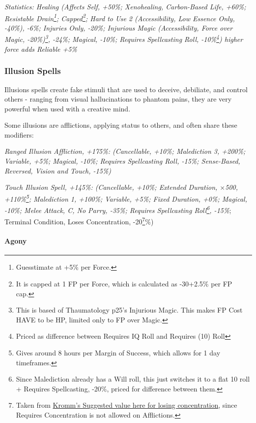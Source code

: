 \begin{multicols*}{3}
	\textcolor{OliveGreen}{\textit{Statistics: Healing (Affects Self, +50\%; Xenohealing, Carbon-Based Life, +60\%; Resistable Drain\footnote{Guesstimate at +5\% per Force.}; Capped\footnote{It is capped at 1 FP per Force, which is calculated as -30+2.5\% per FP cap.}; Hard to Use 2 (Accessibility, Low Essence Only, -40\%), -6\%; Injuries Only, -20\%; Injurious Magic (Accessibility, Force over Magic, -20\%)\footnote{This is based of Thaumatology p25's Injurious Magic. This makes FP Cost HAVE to be HP, limited only to FP over Magic.}, -24\%; Magical, -10\%; Requires Spellcasting Roll, -10\%\footnote{Priced as difference between Requires IQ Roll and Requires (10) Roll}) higher force adds Reliable +5\%}}
	
	\subsubsection{Illusion Spells}
	
	Illusions spells create fake stimuli that are used to deceive, debiliate, and control others - ranging from visual hallucinations to phantom pains, they are very powerful when used with a creative mind.
	
	Some illusions are afflictions, applying status to others, and often share these modifiers:
	
	\textcolor{OliveGreen}{\textit{Ranged Illusion Affliction, +175\%: (Cancellable, +10\%; Malediction 3, +200\%; Variable, +5\%; Magical, -10\%; Requires Spellcasting Roll, -15\%; Sense-Based, Reversed, Vision and Touch, -15\%) }}
	
	\textcolor{OliveGreen}{\textit{Touch Illusion Spell, +145\%: (Cancellable, +10\%; Extended Duration, \(\times\)500, +110\%\footnote{Gives around 8 hours per Margin of Success, which allows for 1 day timeframes.}; Malediction 1, +100\%; Variable, +5\%; Fixed Duration, +0\%; Magical, -10\%; Melee Attack, C, No Parry, -35\%; Requires Spellcasting Roll\footnote{Since Malediction already has a Will roll, this just switches it to a flat 10 roll + Requires Spellcasting, -20\%, priced for difference between them.}, -15\%}; Terminal Condition, Loses Concentration, -20\footnote{Taken from \textcolor{Blue}{\href{http://forums.sjgames.com/showpost.php?p=817197&postcount=7}{Kromm's Suggested value here for losing concentration}}, since Requires Concentration is not allowed on Afflictions.}\%)}
	
	\paragraph{Agony}
	

\end{multicols*}
